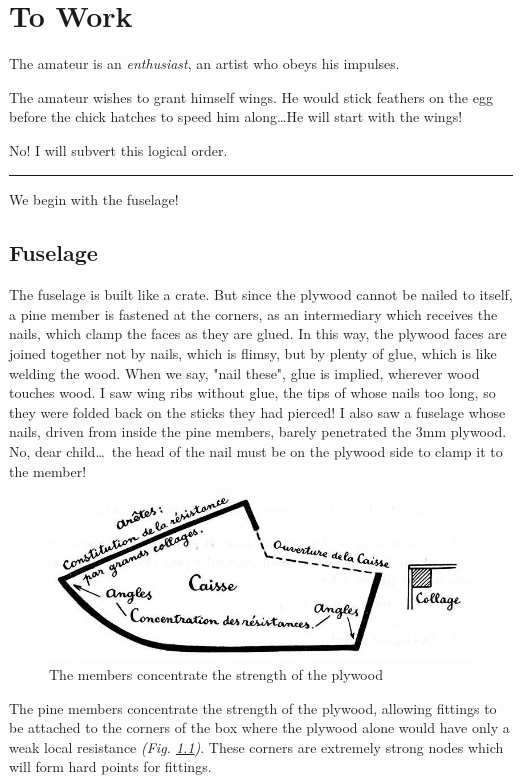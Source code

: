 \documentclass{book}
\newcommand*\sectline{
  \vspace{5pt}
  \begin{center}
    \rule{0.5\linewidth}{\linethickness}
  \end{center}
  \vspace{5pt}
}
\begin{document}
\chapter{To Work}

The amateur is an \textit{enthusiast}, an artist who obeys his
impulses.

The amateur wishes to grant himself wings. He would stick feathers on
the egg before the chick hatches to speed him along\ldots He will
start with the wings!

No!  I will subvert this logical order.

\sectline

We begin with the fuselage!

\section{Fuselage}

The fuselage is built like a crate. But since the plywood cannot be
nailed to itself, a pine member is fastened at the corners, as an
intermediary which receives the nails, which clamp the faces as they
are glued. In this way, the plywood faces are joined together not by
nails, which is flimsy, but by plenty of glue, which is like welding
the wood. When we say, "nail these", glue is implied, wherever wood
touches wood.  I saw wing ribs without glue, the tips of whose nails
too long, so they were folded back on the sticks they had pierced! I
also saw a fuselage whose nails, driven from inside the pine members,
barely penetrated the 3mm plywood.  No, dear child\ldots\ the head of
the nail must be on the plywood side to clamp it to the member!

\begin{figure}
  \includegraphics[width=\linewidth]{fig-15.jpg}
  \caption{The members concentrate the strength of the plywood}
  \label{fig:fifteen}
\end{figure}

The pine members concentrate the strength of the plywood, allowing
fittings to be attached to the corners of the box where the plywood
alone would have only a weak local resistance
\textit{(Fig. \ref{fig:fifteen})}. These corners are extremely strong
nodes which will form hard points for fittings.
\end{document}
